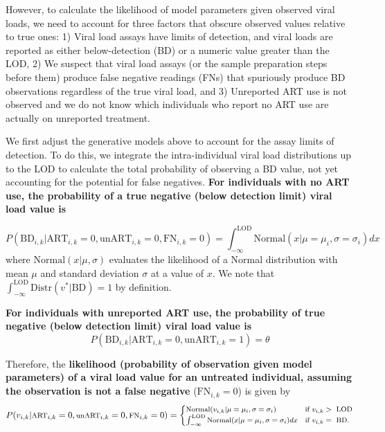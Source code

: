 \documentclass{article}[11pt]
\begin{document}
However, to calculate the likelihood of model parameters given observed viral loads, we need to account for three factors that obscure observed values relative to true ones: 1) Viral load assays have limits of detection, and viral loads are reported as either below-detection (BD) or a numeric value greater than the LOD, 2) We suspect that viral load assays (or the sample preparation steps before them) produce false negative readings (FNs) that spuriously produce BD observations regardless of the true viral load, and 3) Unreported ART use is not observed and we do not know which individuals who report no ART use are actually on unreported treatment. 

We first adjust the generative models above to account for the assay limits of detection. To do this, we integrate the intra-individual viral load distributions up to the LOD to calculate the total probability of observing a BD value, not yet accounting for the potential for false negatives. 
\textbf{For individuals with no ART use, the probability of a true negative (below detection limit) viral load value is}

\begin{equation}
P(\text{BD}_{i,k} | \text{ART}_{i,k} = 0, \text{unART}_{i,k} = 0, \text{FN}_{i,k}=0) = \int_{-\infty}^\text{LOD}\text{Normal}(x | \mu=\mu_i, \sigma=\sigma_i)dx 
\end{equation}
where $\text{Normal}(x | \mu, \sigma)$ evaluates the likelihood of a Normal distribution with mean $\mu$ and standard deviation $\sigma$ at a value of $x$. We note that $\int_{-\infty}^\text{LOD}\text{Distr}(v^*|\text{BD}) = 1$ by definition. 

\textbf{For individuals with unreported ART use, the probability of true negative (below detection limit) viral load value is}
\begin{equation}
P(\text{BD}_{i,k} | \text{ART}_{i,k} = 0, \text{unART}_{i,k} = 1) = \theta 
\end{equation}

Therefore, the \textbf{likelihood (probability of observation given model parameters) of a viral load value for an untreated individual, assuming the observation is not a false negative} ($\text{FN}_{i,k} = 0$) is given by
\begin{equation}
\footnotesize
P(v_{i,k}|\text{ART}_{i,k}=0,\text{unART}_{i,k}=0, \text{FN}_{i,k}=0) = \begin{cases} 
    \text{Normal}(v_{i,k} | \mu=\mu_i, \sigma=\sigma_i) & \text{if } v_{i,k} >\text{ LOD} \\
     \int_{-\infty}^\text{LOD}\text{Normal}(x | \mu=\mu_i, \sigma=\sigma_i)dx  & \text{if } v_{i,k} = \text{ BD}.
\end{cases}
\label{eq:pt_intra_indiv_vl}
\end{equation}
\end{document}
